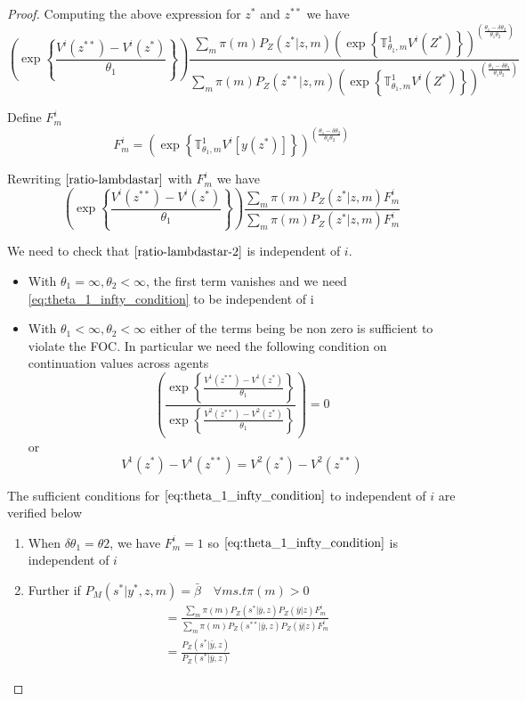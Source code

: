 \documentclass[12pt]{article}
\begin{document}
\begin{proof}
Computing the above expression for $z^*$ and $z^{**}$ we have
\begin{equation}
\label{ratio-lambdastar}
\left(\exp\left\{\frac{V^i(z^{**})-V^i(z^*)}{\theta_1}\right\}\right)
\frac{\sum_{m}\pi(m)P_Z(z^*|z,m)
\left(\exp\left \{
\mathbb{T}^1_{\theta_1,m}V^i(Z^*)
\right\}
\right)^{\left(\frac{\theta_1-\delta\theta_2}{\theta_1\theta_2}\right)}
}
{\sum_{m}\pi(m)P_Z(z^{**}|z,m)
\left(
\exp\left \{
\mathbb{T}^1_{\theta_1,m}V^i(Z^*)
\right\}
\right)^{\left(\frac{\theta_1-\delta\theta_2}{\theta_1\theta_2}\right)
}
}
\end{equation}


Define $F_{m}^i$
\[F_{m}^i=\left(\exp\left \{
\mathbb{T}^1_{\theta_1,m}V^i[y(z^*)]
\right\}
\right)^{\left(\frac{\theta_1-\delta\theta_2}{\theta_1\theta_2}\right)}
\]

Rewriting $\ref{ratio-lambdastar}$ with $F^i_{m}$ we have
\begin{equation}
\label{ratio-lambdastar-2}
\left( \exp\left\{\frac{V^i(z^{**})-V^i(z^*)}{\theta_1}\right\}\right) \frac{\sum_{m}\pi(m)P_Z(z^*|z,m)F^i_m
}
{\sum_{m}\pi(m)P_Z(z^*|z,m)F^i_m
}
\end{equation}

We need to check that $\ref{ratio-lambdastar-2}$ is independent of $i$. 
\begin{itemize}
	\item With $\theta_1=\infty,\theta_2<\infty$, the first term vanishes and we need \ref{eq:theta_1_infty_condition} to be independent of i
	\item With $\theta_1<\infty,\theta_2<\infty$ either of the terms being be non zero is sufficient to violate the FOC. In particular we need the following condition on continuation values across agents
\[\left( \frac{\exp\left\{\frac{V^1(z^{**})-V^1(z^*)}{\theta_1}\right\}}{\exp\left\{\frac{V^2(z^{**})-V^2(z^*)}{\theta_1}\right\}}\right) =0\]
or 
\[V^1(z^*)-V^1(z^{**}) = V^2(z^*)-V^2(z^{**}) \]
\end{itemize}

The sufficient conditions for $\ref{eq:theta_1_infty_condition}$ to independent of $i$ are verified below
\begin{enumerate}
	\item When  $\delta\theta_1=\theta2$, we have $F^i_m=1$ so $\ref{eq:theta_1_infty_condition}$ is independent of $i$
   \item Further if  $P_M(s^*|y^*,z,m)=\bar{\beta} \quad \forall m s.t \pi(m) >0$   
\begin{align}
&=\frac{\sum_{m}\pi(m)P_Z(s^*|\bar{y},z)P_Z(\bar{y}|z)F^i_m
}
{\sum_{m}\pi(m)P_Z(s^{**}|\bar{y},z)P_Z(\bar{y}|z)F^i_m
}\\
&=\frac{P_Z(s^*|\bar{y},z)}
{
P_Z(s^*|\bar{y},z)
}
\end{align}


\end{enumerate}
\end{proof}
\end{document}
